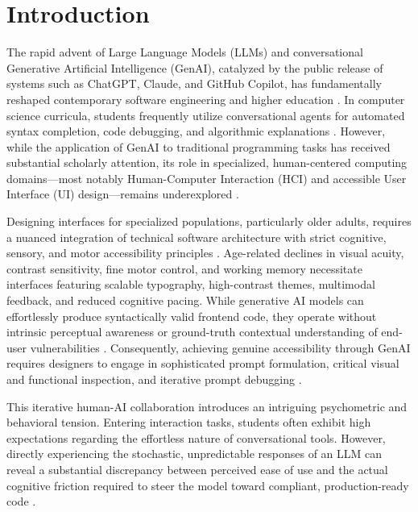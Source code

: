 \documentclass{cleiej}
\begin{document}

\section{Introduction}

The rapid advent of Large Language Models (LLMs) and conversational Generative Artificial Intelligence (GenAI), catalyzed by the public release of systems such as ChatGPT, Claude, and GitHub Copilot, has fundamentally reshaped contemporary software engineering and higher education \cite{prather2023robots, denny2024computing}. In computer science curricula, students frequently utilize conversational agents for automated syntax completion, code debugging, and algorithmic explanations \cite{anderson2023implementing}. However, while the application of GenAI to traditional programming tasks has received substantial scholarly attention, its role in specialized, human-centered computing domains---most notably Human-Computer Interaction (HCI) and accessible User Interface (UI) design---remains underexplored \cite{zamfirescu2023prompt}.

Designing interfaces for specialized populations, particularly older adults, requires a nuanced integration of technical software architecture with strict cognitive, sensory, and motor accessibility principles \cite{who2015world, wcag21}. Age-related declines in visual acuity, contrast sensitivity, fine motor control, and working memory necessitate interfaces featuring scalable typography, high-contrast themes, multimodal feedback, and reduced cognitive pacing. While generative AI models can effortlessly produce syntactically valid frontend code, they operate without intrinsic perceptual awareness or ground-truth contextual understanding of end-user vulnerabilities \cite{yang2020re}. Consequently, achieving genuine accessibility through GenAI requires designers to engage in sophisticated prompt formulation, critical visual and functional inspection, and iterative prompt debugging \cite{amershi2019guidelines}.

This iterative human-AI collaboration introduces an intriguing psychometric and behavioral tension. Entering interaction tasks, students often exhibit high expectations regarding the effortless nature of conversational tools. However, directly experiencing the stochastic, unpredictable responses of an LLM can reveal a substantial discrepancy between perceived ease of use and the actual cognitive friction required to steer the model toward compliant, production-ready code \cite{vaithilingam2022expectation, zamfirescu2023prompt}. 
\end{document}
